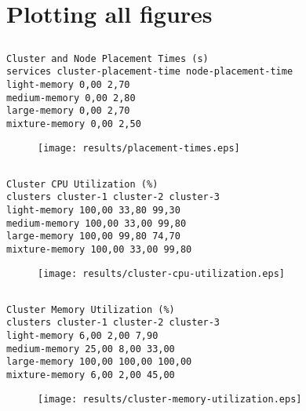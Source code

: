 \documentclass{elsart}
\begin{document}
\section{Plotting all figures}
\subsection{}

\begin{lstlisting}[caption={}]
Cluster and Node Placement Times (s)
services cluster-placement-time node-placement-time
light-memory 0,00 2,70
medium-memory 0,00 2,80
large-memory 0,00 2,70
mixture-memory 0,00 2,50
\end{lstlisting}

\begin{figure}[ht]
\centering
\texttt{[image: results/placement-times.eps]}
\caption{}\label{fig:placement-times.eps}
\end{figure}

\subsection{}

\begin{lstlisting}[caption={}]
Cluster CPU Utilization (%)
clusters cluster-1 cluster-2 cluster-3
light-memory 100,00 33,80 99,30
medium-memory 100,00 33,00 99,80
large-memory 100,00 99,80 74,70
mixture-memory 100,00 33,00 99,80
\end{lstlisting}

\begin{figure}[ht]
\centering
\texttt{[image: results/cluster-cpu-utilization.eps]}
\caption{}\label{fig:cluster-cpu-utilization.eps}
\end{figure}

\subsection{}

\begin{lstlisting}[caption={}]
Cluster Memory Utilization (%)
clusters cluster-1 cluster-2 cluster-3
light-memory 6,00 2,00 7,90
medium-memory 25,00 8,00 33,00
large-memory 100,00 100,00 100,00
mixture-memory 6,00 2,00 45,00
\end{lstlisting}

\begin{figure}[ht]
\centering
\texttt{[image: results/cluster-memory-utilization.eps]}
\caption{}\label{fig:cluster-memory-utilization.eps}
\end{figure}
\end{document}

